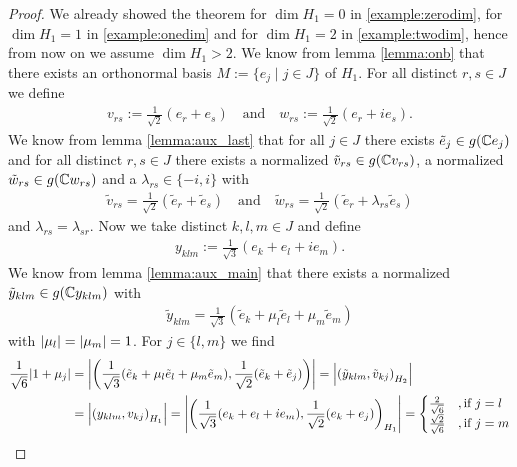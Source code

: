 \begin{proof}
	We already showed the theorem for $\dim H_1 = 0$ in \ref{example:zerodim}, for $\dim H_1 = 1$ in \ref{example:onedim} and for $\dim H_1 = 2$ in \ref{example:twodim}, hence from now on we assume $\dim H_1 > 2$. We know from lemma \ref{lemma:onb} that there exists an orthonormal basis $M := \{e_j \mid j \in J\}$ of $H_1$. For all distinct $r,s \in J$ we define
	\begin{align*}
		v_{rs} := \frac{1}{\sqrt{2}}(e_r + e_s) \quad \text{and} \quad w_{rs} := \frac{1}{\sqrt{2}}(e_r + ie_s).
	\end{align*}
	 We know from lemma \ref{lemma:aux_last} that for all $j \in J$ there exists $\tilde{e}_j \in g(\mathbb{C} e_j)$ and for all distinct $r,s \in J$ there exists a normalized $\tilde{v}_{rs} \in g(\mathbb{C} v_{rs})$, a normalized $\tilde{w}_{rs} \in g(\mathbb{C} w_{rs})$ and a $\lambda_{rs} \in \{-i, i\}$ with 
	 \begin{align*}
	 \tilde{v}_{rs} = \frac{1}{\sqrt{2}}(\tilde{e}_r + \tilde{e}_s) \quad \text{and} \quad \tilde{w}_{rs} = \frac{1}{\sqrt{2}}(\tilde{e}_r + \lambda_{rs} \tilde{e}_s)
	 \end{align*}
	 and $\lambda_{rs} = \lambda_{sr}$. Now we take distinct $k,l,m \in J$ and define
	 \begin{align*}
	 	y_{klm} := \frac{1}{\sqrt{3}}(e_k + e_l + ie_m).
	 \end{align*}
	 We know from lemma \ref{lemma:aux_main} that there exists a normalized $\tilde{y}_{klm} \in g(\mathbb{C} y_{klm})$ with 
	 \begin{align*}
	 	\tilde{y}_{klm} = \frac{1}{\sqrt{3}}(\tilde{e}_k + \mu_l \tilde{e}_l + \mu_m \tilde{e}_m)
	 \end{align*}
	 with ${\left | \mu_l \right |} = {\left | \mu_m \right |} = 1$. For $j \in \{l,m\}$ we find
	 \begin{align*}
	 	\frac{1}{\sqrt{6}} {\left | 1 + \mu_j \right |} &= {\left | {\left ( \frac{1}{\sqrt{3}}(\tilde{e}_k + \mu_l \tilde{e}_l + \mu_m \tilde{e}_m), \frac{1}{\sqrt{2}}(\tilde{e}_k + \tilde{e}_j) \right )} \right |} = {\left | {\left ( \tilde{y}_{klm}, \tilde{v}_{kj} \right )}_{H_2} \right |} \\
	 	&= {\left | {\left ( y_{klm}, v_{kj} \right )}_{H_1} \right |} = {\left | {\left ( \frac{1}{\sqrt{3}}(e_k + e_l + ie_m), \frac{1}{\sqrt{2}}(e_k + e_j) \right )}_{H_1} \right |} = 
	 	\begin{cases}
	 		\frac{2}{\sqrt{6}} &, \text{if } j = l \\
	 		\frac{\sqrt{2}}{\sqrt{6}} &, \text{if } j = m
	 	\end{cases}
	\end{align*}

\end{proof}
